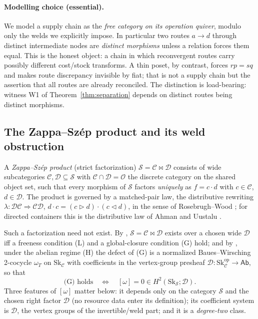 \documentclass[11pt]{article}
\theoremstyle{definition}
\newcommand{\Ab}{\mathsf{Ab}}
\newcommand{\Sc}{\mathcal{S}}
\newcommand{\C}{\mathcal{C}}
\newcommand{\D}{\mathcal{D}}
\newcommand{\Oc}{\mathcal{O}}
\newcommand{\Sk}{\mathrm{Sk}}
\newcommand{\bowtiemap}{\bowtie}
\begin{document}
\paragraph{Modelling choice (essential).} We model a supply chain as the \emph{free category on
its operation quiver}, modulo only the welds we explicitly impose. In particular two routes
$a\to d$ through distinct intermediate nodes are \emph{distinct morphisms} unless a relation
forces them equal. This is the honest object: a chain in which reconvergent routes carry
possibly different cost/stock transforms. A thin poset, by contrast, forces $rp=sq$ and makes
route discrepancy invisible by fiat; that is not a supply chain but the assertion that all
routes are already reconciled. The distinction is load-bearing: witness W1 of
Theorem~\ref{thm:separation} depends on distinct routes being distinct morphisms.

\subsection{The Zappa--Sz\'ep product and its weld obstruction}\label{sec:prelim-weld}

A \emph{Zappa--Sz\'ep product} (strict factorization) $\Sc=\C\bowtiemap\D$ consists of wide
subcategories $\C,\D\subseteq\Sc$ with $\C\cap\D=\Oc$ the discrete category on the shared object
set, such that every morphism of $\Sc$ factors \emph{uniquely} as $f=c\cdot d$ with $c\in\C$,
$d\in\D$. The product is governed by a matched-pair law, the distributive rewriting
$\lambda\colon\D\C\Rightarrow\C\D$, $d\cdot c=(c\triangleright d)\cdot(c\triangleleft d)$,
in the sense of Rosebrugh--Wood \cite{rw}; for directed containers this is the distributive law
of Ahman and Uustalu \cite{au-distlaw}.

Such a factorization need not exist. By \cite{pairwise}, $\Sc=\C\bowtiemap\D$ exists over a
chosen wide $\D$ iff a freeness condition (L) and a global-closure condition (G) hold; and by
\cite{gobstr}, under the abelian regime (H) the defect of (G) is a normalized Baues--Wirsching
2-cocycle $\omega_T$ on $\Sk_\C$ with coefficients in the vertex-group presheaf
$\D\colon\Sk_\C^{\mathrm{op}}\to\Ab$, so that
\[
  \text{(G) holds}\quad\Longleftrightarrow\quad [\omega]=0\in H^2(\Sk_\Sc;\D).
\]
Three features of $[\omega]$ matter below: it depends only on the category $\Sc$ and the chosen
right factor $\D$ (no resource data enter its definition); its coefficient system is $\D$, the
vertex groups of the invertible/weld part; and it is a \emph{degree-two} class.
\end{document}
